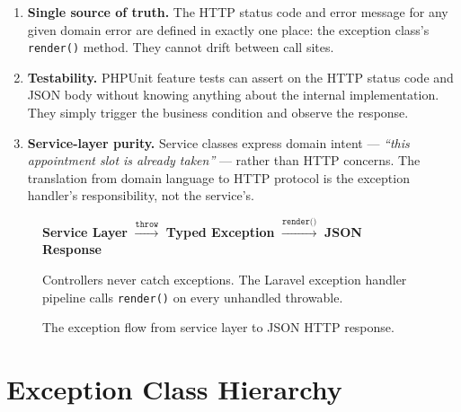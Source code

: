 \begin{enumerate}
  \item \textbf{Single source of truth.} The HTTP status code and error
    message for any given domain error are defined in exactly one place:
    the exception class's \texttt{render()} method. They cannot drift
    between call sites.

  \item \textbf{Testability.} PHPUnit feature tests can assert on the
    HTTP status code and JSON body without knowing anything about the
    internal implementation. They simply trigger the business condition
    and observe the response.

  \item \textbf{Service-layer purity.} Service classes express domain
    intent --- \textit{``this appointment slot is already taken''} ---
    rather than HTTP concerns. The translation from domain language to
    HTTP protocol is the exception handler's responsibility, not the
    service's.
\end{enumerate}

\begin{figure}[h!]
  \centering
  \begin{tcolorbox}[
    enhanced, arc=4pt, boxrule=1pt,
    colback=LightGray, colframe=RuleGray,
    left=12pt, right=12pt, top=10pt, bottom=10pt,
    width=\linewidth,
  ]
  \centering
  \textcolor{PrimaryBlue}{\textbf{Service Layer}}
  \quad\textcolor{red!60!black}{$\xrightarrow{\texttt{throw}}$}\quad
  \textcolor{MethodDelete}{\textbf{Typed Exception}}
  \quad\textcolor{AccentTeal}{$\xrightarrow{\texttt{render()}}$}\quad
  \textcolor{MethodPost}{\textbf{JSON Response}}

  \vspace{6pt}
  \small
  Controllers never catch exceptions. The Laravel exception handler
  pipeline calls \texttt{render()} on every unhandled throwable.
  \end{tcolorbox}
  \caption{The exception flow from service layer to JSON HTTP response.}
  \label{fig:exception-flow}
\end{figure}

\section{Exception Class Hierarchy}
\label{sec:exception-hierarchy}

